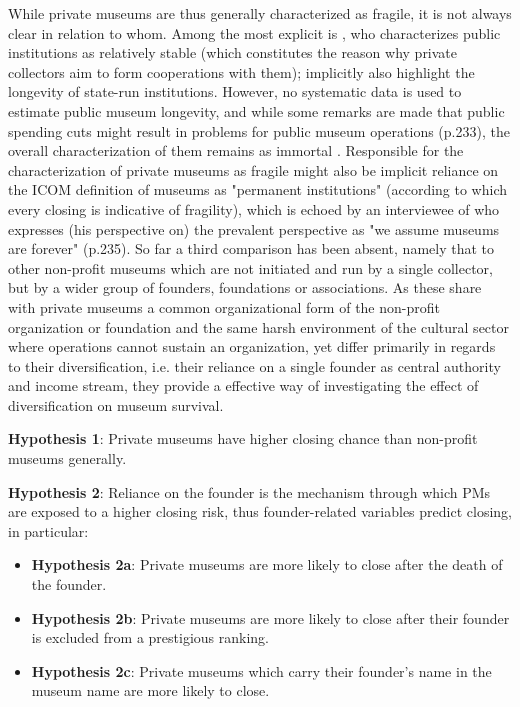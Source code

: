 \documentclass[12pt]{article}
\begin{document}
While private museums are thus generally characterized as fragile, it is not always clear in relation to whom.
Among the most explicit is \textcite{Walker_2019_collector}, who characterizes public institutions as relatively stable (which constitutes the reason why private collectors aim to form cooperations with them); \textcite{Bechtler_Imhof_2018_future} implicitly also highlight the longevity of state-run institutions.
However, no systematic data is used to estimate public museum longevity, and while some
remarks are made that public spending cuts might result in problems for public museum operations (p.233), the overall characterization of them remains as immortal \parencite{Frey_Meier_2002_beyeler}.
Responsible for the characterization of private museums as fragile might also be implicit reliance on the ICOM definition \parencite{ICOM_2024_definition} of museums as "permanent institutions" (according to which every closing is indicative of fragility), which is echoed by an interviewee of \textcite{Walker_2019_collector} who expresses (his perspective on) the prevalent perspective as "we assume museums are forever" (p.235).
So far a third comparison has been absent, namely that to other non-profit museums which are not initiated and run by a single collector, but by a wider group of founders, foundations or associations.
As these share with private museums a common organizational form of the non-profit organization or foundation  and the same harsh environment of the cultural sector where operations cannot sustain an organization, yet differ primarily in regards to their diversification, i.e. their reliance on a single founder as central authority and income stream, they provide a effective way of investigating the effect of diversification on museum survival. 


\textbf{Hypothesis 1}: Private museums have higher closing chance than non-profit museums generally.

\textbf{Hypothesis 2}: Reliance on the founder is the mechanism through which PMs are exposed to a higher closing risk, thus founder-related variables predict closing, in particular: 
\begin{itemize}
\item \textbf{Hypothesis 2a}: Private museums are more likely to close after the death of the founder.
\item \textbf{Hypothesis 2b}: Private museums are more likely to close after their founder is excluded from a prestigious ranking.
\item \textbf{Hypothesis 2c}: Private museums which carry their founder's name in the museum name are more likely to close.
\end{itemize}
\end{document}
